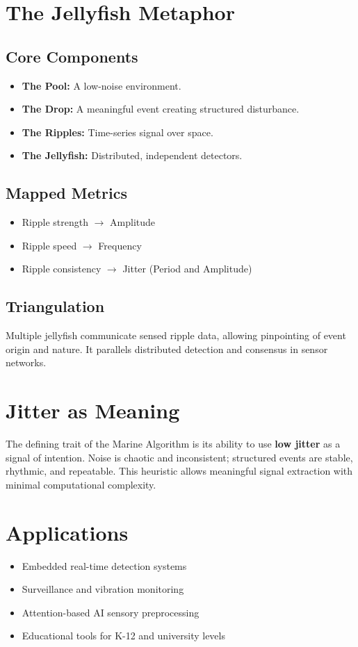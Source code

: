 \documentclass[11pt]{article}
\begin{document}
\section{The Jellyfish Metaphor}
\subsection{Core Components}
\begin{itemize}
  \item \textbf{The Pool:} A low-noise environment.
  \item \textbf{The Drop:} A meaningful event creating structured disturbance.
  \item \textbf{The Ripples:} Time-series signal over space.
  \item \textbf{The Jellyfish:} Distributed, independent detectors.
\end{itemize}

\subsection{Mapped Metrics}
\begin{itemize}
  \item Ripple strength $\rightarrow$ Amplitude
  \item Ripple speed $\rightarrow$ Frequency
  \item Ripple consistency $\rightarrow$ Jitter (Period and Amplitude)
\end{itemize}

\subsection{Triangulation}
Multiple jellyfish communicate sensed ripple data, allowing pinpointing of event origin and nature. It parallels distributed detection and consensus in sensor networks.

\section{Jitter as Meaning}
The defining trait of the Marine Algorithm is its ability to use \textbf{low jitter} as a signal of intention. Noise is chaotic and inconsistent; structured events are stable, rhythmic, and repeatable. This heuristic allows meaningful signal extraction with minimal computational complexity.

\section{Applications}
\begin{itemize}
  \item Embedded real-time detection systems
  \item Surveillance and vibration monitoring
  \item Attention-based AI sensory preprocessing
  \item Educational tools for K-12 and university levels
\end{itemize}
\end{document}
